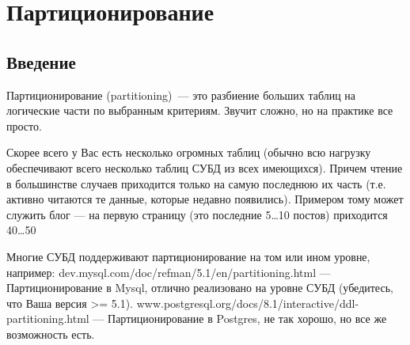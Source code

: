 \chapter{Партиционирование}
\begin{epigraphs}
\end{epigraphs}
\section{Введение}
Партиционирование (partitioning)~--- это разбиение больших таблиц на логические части по выбранным критериям. Звучит сложно, но на практике все просто.

Скорее всего у Вас есть несколько огромных таблиц (обычно всю нагрузку обеспечивают всего несколько таблиц СУБД из всех имеющихся). Причем чтение в большинстве случаев приходится только на самую последнюю их часть (т.е. активно читаются те данные, которые недавно появились). Примером тому может служить блог — на первую страницу (это последние 5…10 постов) приходится 40…50%

Многие СУБД поддерживают партиционирование на том или ином уровне, например:
dev.mysql.com/doc/refman/5.1/en/partitioning.html — Партиционирование в Mysql, отлично реализовано на уровне СУБД (убедитесь, что Ваша версия >= 5.1).
www.postgresql.org/docs/8.1/interactive/ddl-partitioning.html — Партиционирование в Postgres, не так хорошо, но все же возможность есть.